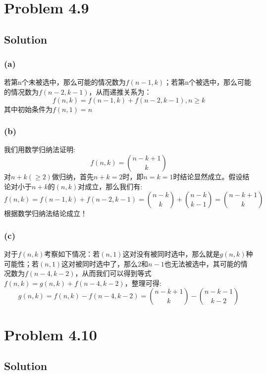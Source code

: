 \documentclass[a4paper]{ctexart}
\begin{document}
\section{Problem 4.9}
\subsection{Solution}
\subsubsection{(a)}
若第n个未被选中，那么可能的情况数为$f(n-1,k)$；若第n个被选中，那么可能的情况数为$f(n-2,k-1)$，从而递推关系为：
\begin{equation}
    f(n,k) = f(n-1,k) + f(n-2,k-1), n\geq k
\end{equation}
其中初始条件为$f(n,1)=n$
\subsubsection{(b)}
我们用数学归纳法证明:
\begin{equation}
    f(n,k) = \binom{n-k+1}{k}
\end{equation}
对$n+k(\geq 2)$做归纳，首先$n+k=2$时，即$n=k=1$时结论显然成立。假设结论对小于$n+k$的$(n,k)$对成立，那么我们有:
\begin{equation}
    f(n,k) = f(n-1,k) + f(n-2,k-1)=\binom{n-k}{k}+\binom{n-k}{k-1}=\binom{n-k+1}{k}
\end{equation}
根据数学归纳法结论成立！

\subsubsection{(c)}
对于$f(n,k)$考察如下情况：若$(n,1)$这对没有被同时选中，那么就是$g(n,k)$种可能性；若$(n,1)$这对被同时选中了，那么$2$和$n-1$也无法被选中，其可能的情况数为$f(n-4,k-2)$，从而我们可以得到等式$f(n,k)=g(n,k)+f(n-4,k-2)$，整理可得:
\begin{equation}
    g(n,k) = f(n,k) - f(n-4,k-2) = \binom{n-k+1}{k} - \binom{n-k-1}{k-2}
\end{equation}

\section{Problem 4.10}
\subsection{Solution}
\end{document}
